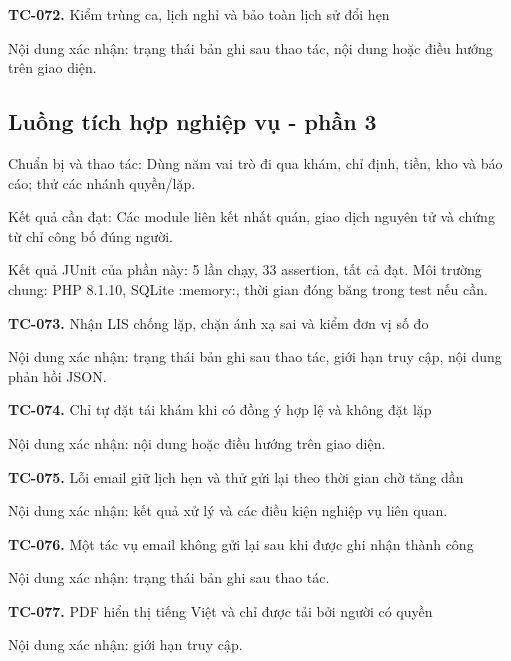 \noindent\textbf{TC-072.} Kiểm trùng ca, lịch nghỉ và bảo toàn lịch sử đổi hẹn\par
Nội dung xác nhận:\allowbreak{} trạng thái bản ghi sau thao tác, nội dung hoặc điều hướng trên giao diện.\allowbreak{}


\par\vspace{8pt}

\subsection{Luồng tích hợp nghiệp vụ - phần 3}
Chuẩn bị và thao tác:\allowbreak{} Dùng năm vai trò đi qua khám, chỉ định, tiền, kho và báo cáo; thử các nhánh quyền/\allowbreak{}lặp.\allowbreak{}

Kết quả cần đạt:\allowbreak{} Các module liên kết nhất quán, giao dịch nguyên tử và chứng từ chỉ công bố đúng người.\allowbreak{}

Kết quả JUnit của phần này:\allowbreak{} 5 lần chạy, 33 assertion, tất cả đạt.\allowbreak{} Môi trường chung:\allowbreak{} PHP 8.\allowbreak{}1.\allowbreak{}10, SQLite :\allowbreak{}memory:\allowbreak{}, thời gian đóng băng trong test nếu cần.\allowbreak{}

\noindent\textbf{TC-073.} Nhận LIS chống lặp, chặn ánh xạ sai và kiểm đơn vị số đo\par
Nội dung xác nhận:\allowbreak{} trạng thái bản ghi sau thao tác, giới hạn truy cập, nội dung phản hồi JSON.\allowbreak{}

\noindent\textbf{TC-074.} Chỉ tự đặt tái khám khi có đồng ý hợp lệ và không đặt lặp\par
Nội dung xác nhận:\allowbreak{} nội dung hoặc điều hướng trên giao diện.\allowbreak{}

\noindent\textbf{TC-075.} Lỗi email giữ lịch hẹn và thử gửi lại theo thời gian chờ tăng dần\par
Nội dung xác nhận:\allowbreak{} kết quả xử lý và các điều kiện nghiệp vụ liên quan.\allowbreak{}

\noindent\textbf{TC-076.} Một tác vụ email không gửi lại sau khi được ghi nhận thành công\par
Nội dung xác nhận:\allowbreak{} trạng thái bản ghi sau thao tác.\allowbreak{}

\noindent\textbf{TC-077.} PDF hiển thị tiếng Việt và chỉ được tải bởi người có quyền\par
Nội dung xác nhận:\allowbreak{} giới hạn truy cập.\allowbreak{}


